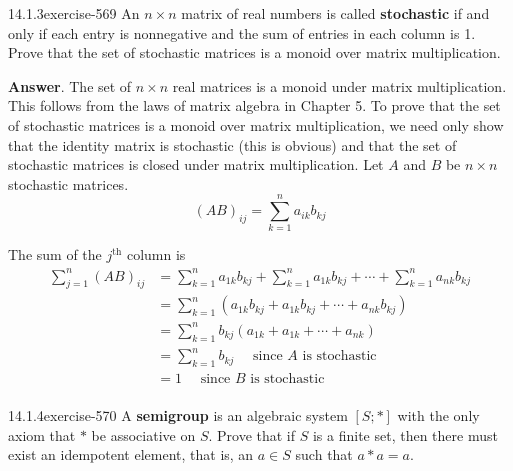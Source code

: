 \documentclass[twoside,10pt,]{book}
\newcommand{\terminology}[1]{\textbf{#1}}
\numberwithin{equation}{section}
\begin{document}
\begin{divisionsolution}{14.1.3}{}{exercise-569}%
\hypertarget{p-5086}{}%
An \(n \times n\)  matrix of real numbers is called \terminology{stochastic} if and only if each entry is nonnegative and the sum of entries in each column is 1. Prove that the set of stochastic matrices is a monoid over matrix multiplication.%
\par\smallskip%
\noindent\textbf{Answer}.\quad%
\hypertarget{p-5087}{}%
The set of \(n \times  n\) real matrices is a monoid under matrix multiplication. This follows from the laws of matrix algebra in Chapter 5. To prove that the set of stochastic matrices is a monoid over matrix multiplication, we need only show that the identity matrix is stochastic (this is obvious) and that the set of stochastic matrices is closed under matrix multiplication. Let \(A\) and \(B\) be \(n \times  n\) stochastic matrices.%
\begin{equation*}
(AB)_{i j}= \sum _{k=1}^n a_{i k} b_{k j}
\end{equation*}
%
\par
\hypertarget{p-5088}{}%
The sum of the \(j^{\textrm{th}}\) column is%
\begin{equation*}
\begin{split}
\sum_{j=1}^n (AB)_{i j} & =\sum_{k=1}^n a_{1 k} b_{k j}+\sum_{k=1}^n a_{1k} b_{k j}+\cdots +\sum_{k=1}^n a_{n k} b_{k j}\\
&=\sum_{k=1}^n \left(a_{1 k} b_{k j}+a_{1k} b_{k j}+\cdots +a_{n k} b_{k j}\right)\\
&=\sum _{k=1}^n b_{k j}\left(a_{1 k} +a_{1k}+\cdots +a_{n k} \right)\\
&= \sum _{k=1}^n  b_{k j} \quad\textrm{         since } A \textrm{ is stochastic}\\
& = 1 \quad\textrm{         since } B \textrm{ is stochastic}\\
\end{split}
\end{equation*}
%
\end{divisionsolution}%
\begin{divisionsolution}{14.1.4}{}{exercise-570}%
\hypertarget{p-5089}{}%
A \terminology{semigroup} is an algebraic system \([S; *]\) with the only axiom that \(*\) be associative on \(S\). Prove that if \(S\) is a finite set, then there must exist an idempotent element, that is, an \(a \in  S\) such that \(a * a = a\).%
\end{divisionsolution}%
\end{document}
